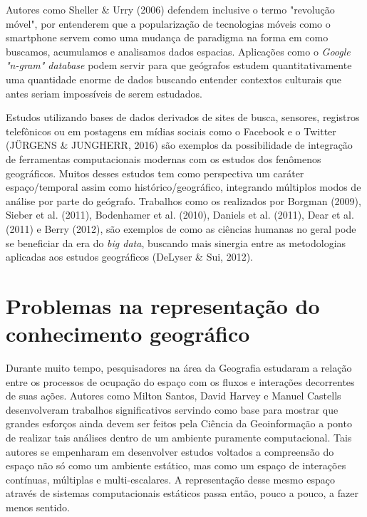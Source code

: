 Autores como Sheller \& Urry (2006) defendem inclusive o termo "revolução móvel", por entenderem que a popularização de tecnologias móveis como o smartphone servem como uma mudança de paradigma na forma em como buscamos, acumulamos e analisamos dados espacias. Aplicações como o \textit{Google "n-gram" database} podem servir para que geógrafos estudem quantitativamente uma quantidade enorme de dados buscando entender contextos culturais que antes seriam impossíveis de serem estudados.

Estudos utilizando bases de dados derivados de sites de busca, sensores, registros telefônicos ou em postagens em mídias sociais como o Facebook e o Twitter (JÜRGENS \& JUNGHERR, 2016) são exemplos da possibilidade de integração de ferramentas computacionais modernas com os estudos dos fenômenos geográficos. Muitos desses estudos tem como perspectiva um caráter espaço/temporal assim como histórico/geográfico, integrando múltiplos modos de análise por parte do geógrafo. Trabalhos como os realizados por Borgman (2009), Sieber et al. (2011), Bodenhamer et al. (2010), Daniels et al. (2011), Dear et al. (2011) e Berry (2012), são exemplos de como as ciências humanas no geral pode se beneficiar da era do \textit{big data}, buscando mais sinergia entre as metodologias aplicadas aos estudos geográficos (DeLyser \& Sui, 2012).

\section{Problemas na representação do conhecimento geográfico}

Durante muito tempo, pesquisadores na área da Geografia estudaram a relação entre os processos de ocupação do espaço com os fluxos e interações decorrentes de suas ações. Autores como Milton Santos, David Harvey e Manuel Castells desenvolveram trabalhos significativos servindo como base para mostrar que grandes esforços ainda devem ser feitos pela Ciência da Geoinformação a ponto de realizar tais análises dentro de um ambiente puramente computacional. Tais autores se empenharam em desenvolver estudos voltados a compreensão do espaço não só como um ambiente estático, mas como um espaço de interações contínuas, múltiplas e multi-escalares. A representação desse mesmo espaço através de sistemas computacionais estáticos passa então, pouco a pouco, a fazer menos sentido. 

